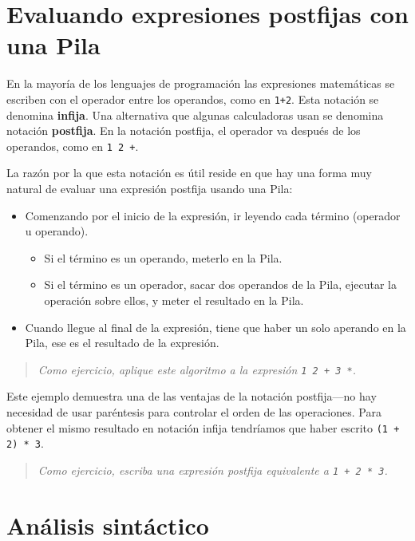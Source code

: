 \section{Evaluando expresiones postfijas con una Pila}

  

En la mayoría de los lenguajes de programación las expresiones matemáticas
se escriben con el operador entre los operandos, como en \texttt{1+2}.
Esta notación se denomina \textbf{infija}. Una alternativa que algunas
calculadoras usan se denomina notación \textbf{postfija}. En la notación
postfija, el operador va después de los operandos, como en \texttt{1
2 +}.

La razón por la que esta notación es útil reside en que hay una forma
muy natural de evaluar una expresión postfija usando una Pila:
\begin{itemize}
\item Comenzando por el inicio de la expresión, ir leyendo cada término
(operador u operando).

\begin{itemize}
\item Si el término es un operando, meterlo en la Pila.
\item Si el término es un operador, sacar dos operandos de la Pila, ejecutar
la operación sobre ellos, y meter el resultado en la Pila.
\end{itemize}
\item Cuando llegue al final de la expresión, tiene que haber un solo aperando
en la Pila, ese es el resultado de la expresión.
\end{itemize}
\begin{quote}
{\em Como ejercicio, aplique este algoritmo a la expresión \texttt{1
2 + 3 {*}}.} 
\end{quote}
Este ejemplo demuestra una de las ventajas de la notación postfija—no
hay necesidad de usar paréntesis para controlar el orden de las operaciones.
Para obtener el mismo resultado en notación infija tendríamos que
haber escrito \texttt{(1 + 2) {*} 3}.
\begin{quote}
{\em Como ejercicio, escriba una expresión postfija equivalente
a \texttt{1 + 2 {*} 3}.} 
\end{quote}

\section{Análisis sintáctico}

